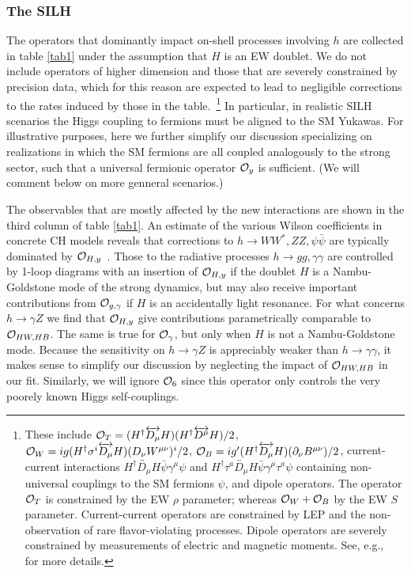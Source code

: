 




\subsubsection{The SILH}

The operators that dominantly impact on-shell processes involving $h$ are collected in table \ref{tab1} under the assumption that $H$ is an EW doublet. We do not include operators of higher dimension and those that are severely constrained by precision data, which for this reason are expected to lead to negligible corrections to the rates induced by those in the table.~\footnote{These include ${\cal O}_T=(H^\dagger\overleftrightarrow{D_\mu}H)(H^\dagger\overleftrightarrow{D^\mu}H)/2$, ${\cal O}_W={i}g(H^\dagger\sigma^i\overleftrightarrow{D_\mu} H)(D_\nu W^{\mu\nu})^i/2$, ${\cal O}_B=ig'(H^\dagger\overleftrightarrow{D_\mu} H)(\partial_\nu B^{\mu\nu})/2$, current-current interactions $H^\dagger \overleftrightarrow{D_\mu}H \bar \psi\gamma^\mu \psi$ and $H^\dagger \tau^a\overleftrightarrow{D_\mu}H \bar \psi\gamma^\mu \tau^a\psi$ containing non-universal couplings to the SM fermions $\psi$, and dipole operators. The operator ${\cal O}_T$ is constrained by the EW $\rho$ parameter; whereas ${\cal O}_W+{\cal O}_B$ by the EW $S$ parameter. Current-current operators are constrained by LEP and the non-observation of rare flavor-violating processes. Dipole operators are severely constrained by measurements of electric and magnetic moments. See, e.g.,~\cite{Contino:2013kra} for more details.%
} In particular, in realistic SILH scenarios the Higgs coupling to fermions must be aligned to the SM Yukawas. For illustrative purposes, here we further simplify our discussion specializing on realizations in which the SM fermions are all coupled analogously to the strong sector, such that a universal fermionic operator ${\cal O}_y$ is sufficient. (We will comment below on more genneral scenarios.)

The observables that are mostly affected by the new interactions are shown in the third column of table \ref{tab1}. An estimate of the various Wilson coefficients in concrete CH models reveals that corrections to $h\to WW^*,ZZ,\psi\bar\psi$ are typically dominated by ${\cal O}_{H,y}$~\cite{Giudice:2007fh}. Those to the radiative processes $h\to gg,\gamma\gamma$ are controlled by 1-loop diagrams with an insertion of ${\cal O}_{H,y}$ if the doublet $H$ is a Nambu-Goldstone mode of the strong dynamics, but may also receive important contributions from ${\cal O}_{g,\gamma}$ if $H$ is an accidentally light resonance. For what concerns $h\to\gamma Z$ we find that ${\cal O}_{H,y}$ give contributions parametrically comparable to ${\cal O}_{HW, HB}$. The same is true for ${\cal O}_{\gamma}$, but only when $H$ is not a Nambu-Goldstone mode. Because the sensitivity on $h\to\gamma Z$ is appreciably weaker than $h\to\gamma\gamma$, it makes sense to simplify our discussion by neglecting the impact of ${\cal O}_{HW, HB}$ in our fit. Similarly, we will ignore ${\cal O}_6$ since this operator only controls the very poorely known Higgs self-couplings.

